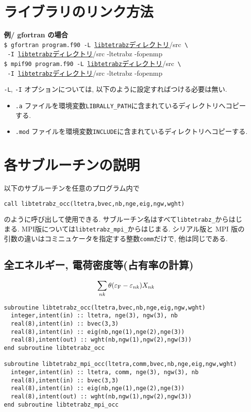 \documentclass[12pt]{jarticle}
\begin{document}
\section{ライブラリのリンク方法}

{\bf 例/ gfortran の場合}\\
\verb|$ gfortran program.f90 -L |\underline{\texttt{libtetrabz}ディレクトリ}/src\verb| \|\\
\verb| -I |\underline{\texttt{libtetrabz}ディレクトリ}/src -ltetrabz -fopenmp
\\
\verb|$ mpif90 program.f90 -L |\underline{\texttt{libtetrabz}ディレクトリ}/src\verb| \|\\
\verb| -I |\underline{\texttt{libtetrabz}ディレクトリ}/src -ltetrabz -fopenmp

\verb|-L|, \verb|-I| オプションについては, 以下のように設定すればつける必要は無い.
\begin{itemize}
\item \verb|.a| ファイルを環境変数\verb|LIBRALLY_PATH|に含まれているディレクトリへコピーする.
\item \verb|.mod| ファイルを環境変数\verb|INCLUDE|に含まれているディレクトリへコピーする.
\end{itemize}

\section{各サブルーチンの説明}

以下のサブルーチンを任意のプログラム内で
\begin{verbatim}
call libtetrabz_occ(ltetra,bvec,nb,nge,eig,ngw,wght)
\end{verbatim}
のように呼び出して使用できる. 
サブルーチン名はすべて\verb|libtetrabz_|からはじまる. 
MPI版については\verb|libtetrabz_mpi_|からはじまる.
シリアル版と MPI 版の引数の違いはコミニュケータを指定する整数\verb|comm|だけで, 他は同じである.

\newpage

\subsection{全エネルギー, 電荷密度等(占有率の計算)}

\begin{align}
\sum_{n k} \theta(\varepsilon_{\rm F} - \varepsilon_{n k}) X_{n k}
\end{align}

\begin{verbatim}
subroutine libtetrabz_occ(ltetra,bvec,nb,nge,eig,ngw,wght)
  integer,intent(in) :: ltetra, nge(3), ngw(3), nb
  real(8),intent(in) :: bvec(3,3)
  real(8),intent(in) :: eig(nb,nge(1),nge(2),nge(3))
  real(8),intent(out) :: wght(nb,ngw(1),ngw(2),ngw(3))
end subroutine libtetrabz_occ

subroutine libtetrabz_mpi_occ(ltetra,comm,bvec,nb,nge,eig,ngw,wght)
  integer,intent(in) :: ltetra, comm, nge(3), ngw(3), nb
  real(8),intent(in) :: bvec(3,3)
  real(8),intent(in) :: eig(nb,nge(1),nge(2),nge(3))
  real(8),intent(out) :: wght(nb,ngw(1),ngw(2),ngw(3))
end subroutine libtetrabz_mpi_occ
\end{verbatim}
\end{document}

